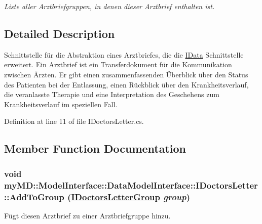 \begin{CompactItemize}
\begin{CompactList}\small\item\em Liste aller Arztbriefgruppen, in denen dieser Arztbrief enthalten ist. \item\end{CompactList}\end{CompactItemize}


\subsection{Detailed Description}
Schnittstelle f\"{u}r die Abstraktion eines Arztbriefes, die die \hyperlink{interfacemy_m_d_1_1_model_interface_1_1_data_model_interface_1_1_i_data}{IData} Schnittstelle erweitert. Ein Arztbrief ist ein Transferdokument f\"{u}r die Kommunikation zwischen \"{A}rzten. Er gibt einen zusammenfassenden \"{U}berblick \"{u}ber den Status des Patienten bei der Entlassung, einen R\"{u}ckblick \"{u}ber den Krankheitsverlauf, die veranlasste Therapie und eine Interpretation des Geschehens zum Krankheitsverlauf im speziellen Fall. 



Definition at line 11 of file IDoctors\-Letter.cs.

\subsection{Member Function Documentation}
\hypertarget{interfacemy_m_d_1_1_model_interface_1_1_data_model_interface_1_1_i_doctors_letter_06720c4c5d7e38157063166e916bbf8a}{
\subsubsection[AddToGroup]{\setlength{\rightskip}{0pt plus 5cm}void my\-MD::Model\-Interface::Data\-Model\-Interface::IDoctors\-Letter::Add\-To\-Group (\hyperlink{interfacemy_m_d_1_1_model_interface_1_1_data_model_interface_1_1_i_doctors_letter_group}{IDoctors\-Letter\-Group} {\em group})}}
\label{db/d8c/interfacemy_m_d_1_1_model_interface_1_1_data_model_interface_1_1_i_doctors_letter_06720c4c5d7e38157063166e916bbf8a}


F\"{u}gt diesen Arztbrief zu einer Arztbriefgruppe hinzu. 


